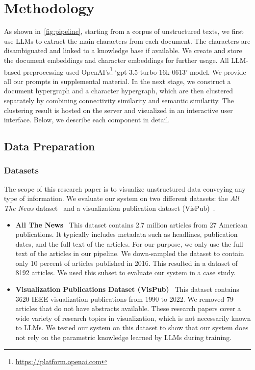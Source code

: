 \section{Methodology}\label{sec: methodology}
As shown in~\autoref{fig:pipeline}, starting from a corpus of unstructured texts,
we first use LLMs to extract the main characters from each document.
The characters are disambiguated and linked to a knowledge base if available.
We create and store the document embeddings and character embeddings for further usage.
All LLM-based preprocessing used OpenAI's\footnote{\url{https://platform.openai.com}} `gpt-3.5-turbo-16k-0613' model.
We provide all our prompts in supplemental material.
In the next stage, we construct a document hypergraph and a character hypergraph, which are then clustered separately by combining connectivity similarity and semantic similarity.
The clustering result is hosted on the server and visualized in an interactive user interface.
Below, we describe each component in detail.
\subsection{Data Preparation}\label{sec: preprocessing}
\subsubsection{Datasets}
The scope of this research paper is to visualize unstructured data conveying any type of information. 
We evaluate our system on two different datasets: the \textit{All The News} dataset~\cite{allthenews} and a visualization publication dataset (VisPub)~\cite{vispub}.
\begin{itemize}
    \item \textbf{All The News} \, This dataset contains 2.7 million articles from 27 American publications.  It typically includes metadata such as headlines, publication dates, and the full text of the articles. For our purpose, we only use the full text of the articles in our pipeline. We down-sampled the dataset to contain only 10 percent of articles published in 2016. This resulted in a dataset of 8192 articles. We used this subset to evaluate our system in a case study.
    \item \textbf{Visualization Publications Dataset (VisPub)} \, This dataset contains 3620 IEEE visualization publications from 1990 to 2022. We removed 79 articles that do not have abstracts available. These research papers cover a wide variety of research topics in visualization, which is not necessarily known to LLMs. We tested our system on this dataset to show that our system does not rely on the parametric knowledge learned by LLMs during training.
\end{itemize}
